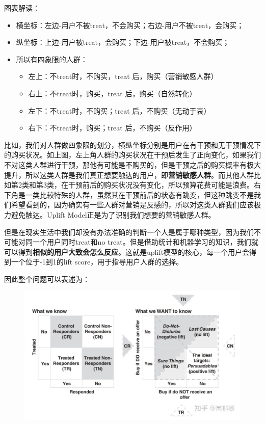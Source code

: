 \documentclass[12pt]{article}
\begin{document}
图表解读：
\begin{itemize}
\setlength{\itemsep}{0pt}
\setlength{\parsep}{0pt}
\setlength{\parskip}{0pt}
    \item 横坐标：左边-用户不被treat，不会购买；右边-用户不被treat，会购买；
    \item 纵坐标：上边-用户被treat，会购买；下边-用户被treat，不会购买；
    \item 所以有四象限的人群：
    \begin{itemize}
\setlength{\itemsep}{0pt}
\setlength{\parsep}{0pt}
\setlength{\parskip}{0pt}
    \item 左上：不treat时，不购买，treat 后，购买（营销敏感人群）
    \item 右上：不treat时，购买，treat 后，购买（自然转化）
    \item 左下：不treat时，不购买；treat 后，不购买（无动于衷）
    \item 右下：不treat时，购买；treat 后，不购买（反作用）
\end{itemize}
\end{itemize}

比如，我们对人群做四象限的划分，横纵坐标分别是用户在有干预和无干预情况下的购买状况。如上图，左上角人群的购买状况在干预后发生了正向变化，如果我们不对这类人群进行干预，那他有可能是不购买的，但是干预之后的购买概率有极大提升，所以这类人群是我们真正想要触达的用户，即\textbf{营销敏感人群}。而其他人群比如第2类和第3类，在干预前后的购买状况没有变化，所以预算花费可能是浪费。右下角是一类比较特殊的人群，虽然其在干预前后的状态有跳变，但这种跳变不是我们希望看到的，因为确实有一些人群对营销是反感的，所以对这类人群我们应该极力避免触达。Uplift Model正是为了识别我们想要的营销敏感人群。

但是在现实生活中我们却没有办法准确的判断一个人是属于哪种类型，因为我们不可能对同一个用户同时treat和no treat。但是借助统计和机器学习的知识，我们就可以得到\textbf{相似的用户大致会怎么反应}。这就是uplift模型的核心，每一个用户会得到一个位于-1到1的lift score，用于指导用户人群的选择。

因此整个问题可以表述为：
\begin{figure}[H]
    \centering
    \includegraphics[width=1\textwidth]{fig/CasualInference-Uplift-Model-Problem.png}
\end{figure}
\end{document}
